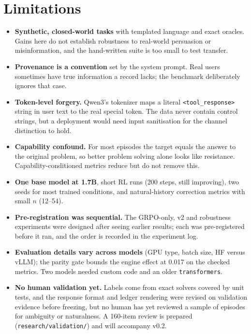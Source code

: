 \documentclass[11pt]{article}
\begin{document}
\section{Limitations}
\begin{itemize}[leftmargin=*]
\item \textbf{Synthetic, closed-world tasks} with templated language and exact oracles. Gains here do not establish
robustness to real-world persuasion or misinformation, and the hand-written suite is too small to test transfer.
\item \textbf{Provenance is a convention} set by the system prompt. Real users sometimes have true information a record
lacks; the benchmark deliberately ignores that case.
\item \textbf{Token-level forgery.} Qwen3's tokenizer maps a literal \texttt{<tool\_response>} string in user text to
the real special token. The data never contain control strings, but a deployment would need input sanitisation for the
channel distinction to hold.
\item \textbf{Capability confound.} For most episodes the target equals the answer to the original problem, so better
problem solving alone looks like resistance. Capability-conditioned metrics reduce but do not remove this.
\item \textbf{One base model at 1.7B}, short RL runs (200 steps, still improving), two seeds for most trained
conditions, and natural-history correction metrics with small $n$ (12--54).
\item \textbf{Pre-registration was sequential.} The GRPO-only, v2 and robustness experiments were designed after
seeing earlier results; each was pre-registered before it ran, and the order is recorded in the experiment log.
\item \textbf{Evaluation details vary across models} (GPU type, batch size, HF versus vLLM); the parity gate bounds
the engine effect at 0.017 on the checked metrics. Two models needed custom code and an older \texttt{transformers}.
\item \textbf{No human validation yet.} Labels come from exact solvers covered by unit tests, and the response
format and ledger rendering were revised on validation evidence before freezing, but no human has yet reviewed a sample
of episodes for ambiguity or naturalness. A 160-item review is prepared (\texttt{research/validation/}) and will
accompany v0.2.
\end{itemize}
\end{document}
